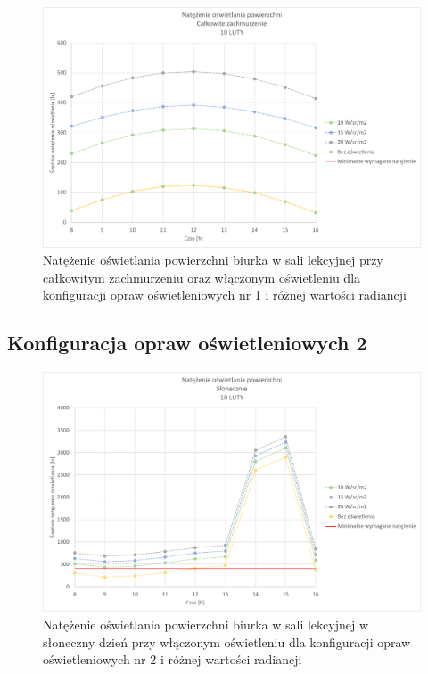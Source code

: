 \documentclass[a4paper,12pt]{article}
\begin{document}
	\begin{figure}[!ht]
		\includegraphics[scale=0.8]{Wykresy/oswietlenie_1_calkowite_zachmurzenie.pdf}
		\caption{Natężenie oświetlania powierzchni biurka w sali lekcyjnej przy całkowitym zachmurzeniu  oraz włączonym oświetleniu dla konfiguracji opraw oświetleniowych nr 1 i różnej wartości radiancji}
		\label{oswietlenie_1_calkowite_zachmurzenie}
	\end{figure}
	\newpage

	\subsection{Konfiguracja opraw oświetleniowych 2}
	\label{subsec:oswietlenie_2}
	
	\begin{figure}[!ht]
		\centering
		\includegraphics[scale=0.8]{Wykresy/oswietlenie_2_slonecznie.pdf}
		\caption{Natężenie oświetlania powierzchni biurka w sali lekcyjnej w słoneczny dzień przy włączonym oświetleniu dla konfiguracji opraw oświetleniowych nr 2 i różnej wartości radiancji}
		\label{oswietlenie_2_slonecznie}
	\end{figure}
	
\end{document}
